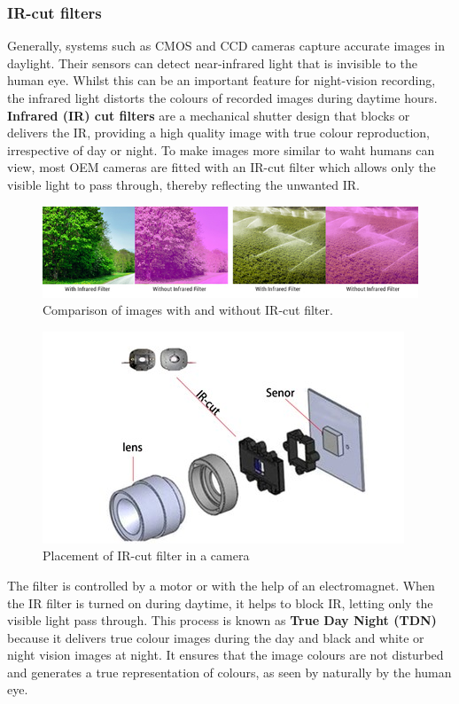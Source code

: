 \documentclass[10pt]{article}
\begin{document}
\begin{multicols}{2}
\subsubsection{IR-cut filters}
Generally, systems such as CMOS and CCD cameras capture accurate images in daylight. Their sensors can detect near-infrared light that is invisible to the human eye. Whilst this can be an important feature for night-vision recording, the infrared light distorts the colours of recorded images during daytime hours.
\newline
\textbf{Infrared (IR) cut filters} are a mechanical shutter design that blocks or delivers the IR, providing a high quality image with true colour reproduction, irrespective of day or night. To make images more similar to waht humans can view, most OEM cameras are fitted with an IR-cut filter which allows only the visible light to pass through, thereby reflecting the unwanted IR.
\begin{figure}[H]
    \centering
    \includegraphics[width=0.8\linewidth]{Images/Week 1/IR-cut.jpg}
    \caption{Comparison of images with and without IR-cut filter.}
    \label{fig:IR-cut}
\end{figure}
\begin{figure}[H]
    \centering
    \includegraphics[width=0.8\linewidth]{Images/Week 1/IR-cut-diagram.jpg}
    \caption{Placement of IR-cut filter in a camera}
    \label{fig:IR-cut-diagram}
\end{figure}
The filter is controlled by a motor or with the help of an electromagnet. When the IR filter is turned on during daytime, it helps to block IR, letting only the visible light pass through. This process is known as \textbf{True Day Night (TDN)} because it delivers true colour images during the day and black and white or night vision images at night. It ensures that the image colours are not disturbed and generates a true representation of colours, as seen by naturally by the human eye.

\end{multicols}
\end{document}
